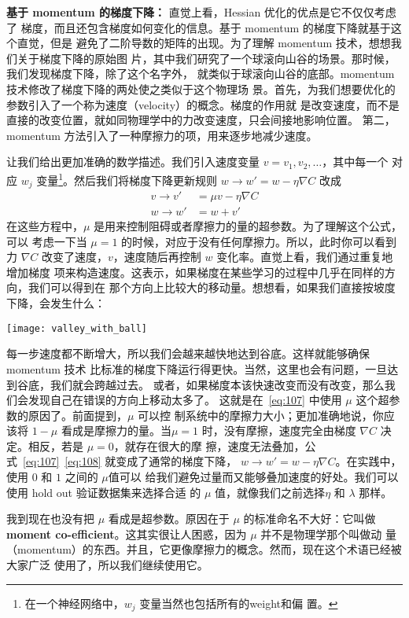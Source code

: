 \textbf{基于 momentum 的梯度下降：} 直觉上看，Hessian 优化的优点是它不仅仅考虑了
梯度，而且还包含梯度如何变化的信息。基于 momentum 的梯度下降就基于这个直觉，但是
避免了二阶导数的矩阵的出现。为了理解 momentum 技术，想想我们关于梯度下降的原始图
片，其中我们研究了一个球滚向山谷的场景。那时候，我们发现梯度下降，除了这个名字外，
就类似于球滚向山谷的底部。momentum 技术修改了梯度下降的两处使之类似于这个物理场
景。首先，为我们想要优化的参数引入了一个称为速度（velocity）的概念。梯度的作用就
是改变速度，而不是直接的改变位置，就如同物理学中的力改变速度，只会间接地影响位置。
第二，momentum 方法引入了一种摩擦力的项，用来逐步地减少速度。

让我们给出更加准确的数学描述。我们引入速度变量 $v = v_1, v_2, \ldots$，其中每一个
对应 $w_j$ 变量\footnote{在一个神经网络中，$w_j$ 变量当然也包括所有的\gls*{weight}和偏
  置。}。然后我们将梯度下降更新规则 $w\rightarrow w'=w-\eta\nabla C$ 改成
\begin{align} 
  v \rightarrow v' &= \mu v - \eta \nabla C \label{eq:107}\tag{107}\\
  w \rightarrow w' &= w+v' \label{eq:108}\tag{108}
\end{align}
在这些方程中，$\mu$ 是用来控制阻碍或者摩擦力的量的超参数。为了理解这个公式，可以
考虑一下当 $\mu=1$ 的时候，对应于没有任何摩擦力。所以，此时你可以看到力 $\nabla
C$ 改变了速度，$v$，速度随后再控制 $w$ 变化率。直觉上看，我们通过重复地增加梯度
项来构造速度。这表示，如果梯度在某些学习的过程中几乎在同样的方向，我们可以得到在
那个方向上比较大的移动量。想想看，如果我们直接按坡度下降，会发生什么：
\begin{center}
  \texttt{[image: valley\_with\_ball]}
\end{center}

每一步速度都不断增大，所以我们会越来越快地达到谷底。这样就能够确保 momentum 技术
比标准的梯度下降运行得更快。当然，这里也会有问题，一旦达到谷底，我们就会跨越过去。
或者，如果梯度本该快速改变而没有改变，那么我们会发现自己在错误的方向上移动太多了。
这就是在~\eqref{eq:107} 中使用 $\mu$ 这个超参数的原因了。前面提到，$\mu$ 可以控
制系统中的摩擦力大小；更加准确地说，你应该将 $1-\mu$ 看成是摩擦力的量。当$\mu=1$
时，没有摩擦，速度完全由梯度 $\nabla C$ 决定。相反，若是 $\mu=0$，就存在很大的摩
擦，速度无法叠加，公式~\eqref{eq:107}~\eqref{eq:108} 就变成了通常的梯度下降，
$w\rightarrow w'=w-\eta \nabla C$。在实践中，使用 $0$ 和 $1$ 之间的 $\mu$值可以
给我们避免过量而又能够叠加速度的好处。我们可以使用 hold out 验证数据集来选择合适
的 $\mu$ 值，就像我们之前选择$\eta$ 和 $\lambda$ 那样。

我到现在也没有把 $\mu$ 看成是超参数。原因在于 $\mu$ 的标准命名不大好：它叫做
\textbf{moment co-efficient}。这其实很让人困惑，因为 $\mu$ 并不是物理学那个叫做动
量（momentum）的东西。并且，它更像摩擦力的概念。然而，现在这个术语已经被大家广泛
使用了，所以我们继续使用它。


